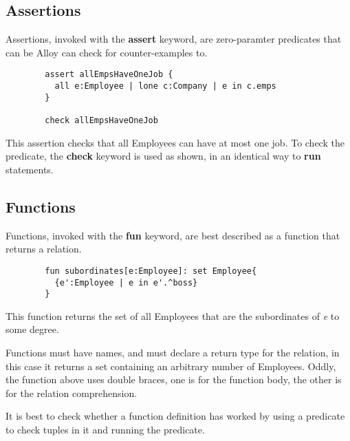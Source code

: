\documentclass[10pt]{article}
\begin{document}
    \subsection*{Assertions}
      Assertions, invoked with the \textbf{assert} keyword, are zero-paramter predicates that can be Alloy can check for counter-examples to.
      \begin{lstlisting}
        assert allEmpsHaveOneJob {
          all e:Employee | lone c:Company | e in c.emps
        }

        check allEmpsHaveOneJob
      \end{lstlisting}\par
      This assertion checks that all Employees can have at most one job. To check the predicate, the \textbf{check} keyword is used as shown, in an identical way to \textbf{run} statements.
    \subsection*{Functions}
      Functions, invoked with the \textbf{fun} keyword, are best described as a function that returns a relation.
      \begin{lstlisting}
        fun subordinates[e:Employee]: set Employee{
          {e':Employee | e in e'.^boss}
        }
      \end{lstlisting}\par
      This function returns the set of all Employees that are the subordinates of \textit{e} to some degree.\par
      Functions must have names, and must declare a return type for the relation, in this case it returns a set containing an arbitrary number of Employees. Oddly, the function above uses double braces, one is for the function body, the other is for the relation comprehension.\par
      It is best to check whether a function definition has worked by using a predicate to check tuples in it and running the predicate.
\end{document}
